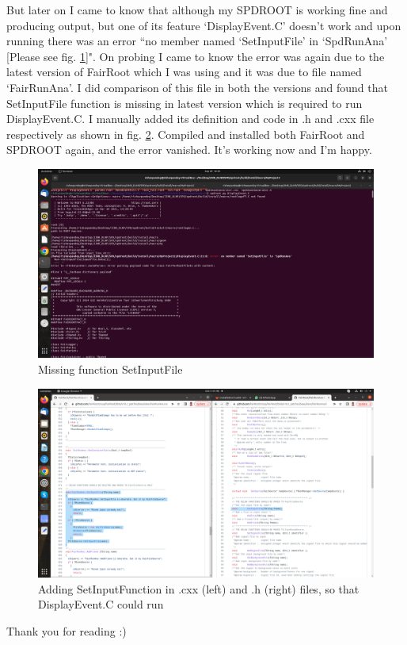\documentclass[12pt]{article}
\begin{document}
But later on I came to know that although my SPDROOT is working fine and producing output, but one of its feature `DisplayEvent.C' doesn't work and upon running there was an error ``no member named `SetInputFile' in `SpdRunAna' [Please see fig. \ref{Missing function SetInputFile}]". On probing I came to know the error was again due to the latest version of FairRoot which I was using and it was due to file named `FairRunAna'. I did comparison of this file in both the versions and found that SetInputFile function is missing in latest version which is required to run DisplayEvent.C. I manually added its definition and code in .h and .cxx file respectively as shown in fig. \ref{Adding SetInputFunction in .cxx (left) and .h (right) files, so that DisplayEvent.C could run}. Compiled and installed both FairRoot and SPDROOT again, and the error vanished. It's working now and I'm happy.\\

\clearpage

\begin{figure}[h]
\centering
\includegraphics[scale=0.165]{ss4.png}
\caption{Missing function SetInputFile}
\label{Missing function SetInputFile}
\end{figure}

\begin{figure}[h]
\centering
\includegraphics[scale=0.165]{ss2.png}
\caption{Adding SetInputFunction in .cxx (left) and .h (right) files, so that DisplayEvent.C could run}
\label{Adding SetInputFunction in .cxx (left) and .h (right) files, so that DisplayEvent.C could run}
\end{figure}

Thank you for reading :)
\end{document}
